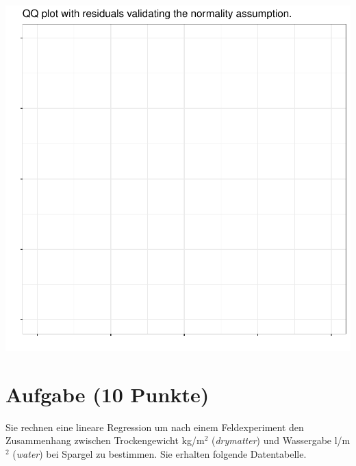 \documentclass[a4paper, 10pt]{scrartcl}\usepackage[]{graphicx}\usepackage[]{xcolor}
\makeatletter
\def\maxwidth{ %
  \ifdim\Gin@nat@width>\linewidth
    \linewidth
  \else
    \Gin@nat@width
  \fi
}
\makeatother
\begin{document}
{\centering \includegraphics[width=\maxwidth]{img/regression-04-1} 

}



 
\clearpage

\section{Aufgabe \hfill (10 Punkte)}

Sie rechnen eine lineare Regression um nach einem Feldexperiment den
Zusammenhang zwischen Trockengewicht kg/m$^2$ (\textit{drymatter}) und
Wassergabe l/m$^2$ (\textit{water}) bei Spargel zu bestimmen. Sie erhalten
folgende Datentabelle.
\end{document}
